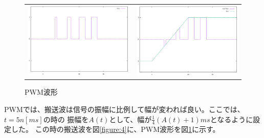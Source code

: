 \documentclass[dvipdfmx]{jsarticle}
\begin{document}
    \subsection{}
    \begin{figure}[H]
        \begin{tabular}{cc}
            \begin{minipage}{0.45\hsize}
                \centering
                \includegraphics[width=0.9\hsize]{graph4.png}
                \caption{PWMの搬送波}
                \label{figure:4}
            \end{minipage} & 
            \begin{minipage}{0.45\hsize}
                \centering
                \includegraphics[width=0.9\hsize]{graph5.png}
                \caption{PWM波形}
                \label{figure:5}
            \end{minipage}
        \end{tabular}
    \end{figure}
    PWMでは、搬送波は信号の振幅に比例して幅が変われば良い。ここでは、$t = 5n[ms]$の時の
    振幅を$A(t)$として、幅が$\frac{1}{4}(A(t)+1)ms$となるように設定した。
    この時の搬送波を図\ref{figure:4}に、PWM波形を図\ref{figure:5}に示す。
\end{document}
